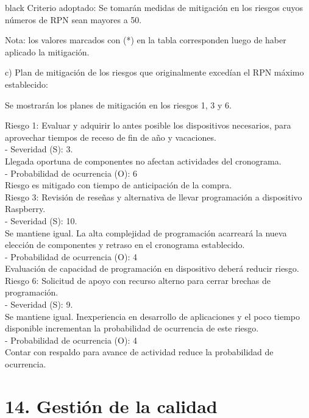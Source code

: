 \documentclass[
11pt, %
codirector, %
]{charter}
\begin{document}
\begin{consigna}{black}
Criterio adoptado: 
Se tomarán medidas de mitigación en los riesgos cuyos números de RPN sean mayores a 50.

Nota: los valores marcados con (*) en la tabla corresponden luego de haber aplicado la mitigación.

c) Plan de mitigación de los riesgos que originalmente excedían el RPN máximo establecido:
 
Se mostrarán los planes de mitigación en los riesgos 1, 3 y 6. 
 
Riesgo 1: Evaluar y adquirir lo antes posible los dispositivos necesarios, para aprovechar tiempos de receso de fin de año y vacaciones. \\
  - Severidad (S): 3. \\
	Llegada oportuna de componentes no afectan actividades del cronograma. \\
  - Probabilidad de ocurrencia (O): 6 \\
	Riesgo es mitigado con tiempo de anticipación de la compra. \\

Riesgo 3: Revisión de reseñas y alternativa de llevar programación a dispositivo Raspberry. \\
  - Severidad (S): 10. \\
	Se mantiene igual. La alta complejidad de programación acarreará la nueva elección de componentes y retraso en el cronograma establecido. \\
  - Probabilidad de ocurrencia (O): 4 \\
	Evaluación de capacidad de programación en dispositivo deberá reducir riesgo. \\

Riesgo 6: Solicitud de apoyo con recurso alterno para cerrar brechas de programación. \\ 
  - Severidad (S): 9. \\
	Se mantiene igual. Inexperiencia en desarrollo de aplicaciones y el poco tiempo disponible incrementan la probabilidad de ocurrencia de este riesgo. \\
  - Probabilidad de ocurrencia (O): 4 \\
	Contar con respaldo para avance de actividad reduce la probabilidad de ocurrencia. \\

\end{consigna}


\section{14. Gestión de la calidad}
\label{sec:calidad}
\end{document}

